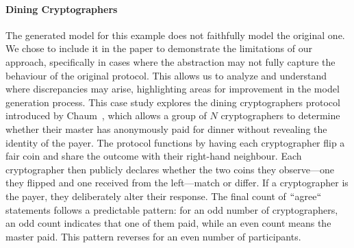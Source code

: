 \paragraph{Dining Cryptographers}
The generated model for this example does not faithfully model the original one. We chose 
to include it in the paper to demonstrate the limitations of our approach, 
specifically in cases where the abstraction may not fully capture the behaviour of the original protocol. 
This allows us to analyze and understand where discrepancies may arise, 
highlighting areas for improvement in the model generation process.
This case study explores the dining cryptographers protocol introduced by Chaum~\cite{Cha88}, which allows a group of $N$ cryptographers to determine whether their master has anonymously paid for dinner without revealing the identity of the payer. The protocol functions by having each cryptographer flip a fair coin and share the outcome with their right-hand neighbour. Each cryptographer then publicly declares whether the two coins they observe—one they flipped and one received from the left—match or differ. If a cryptographer is the payer, they deliberately alter their response. The final count of $\lq\lq$agree$\lq\lq$ statements follows a predictable pattern: for an odd number of cryptographers, an odd count indicates that one of them paid, while an even count means the master paid. This pattern reverses for an even number of participants.


